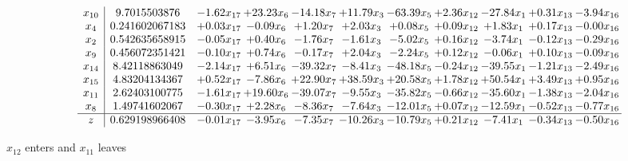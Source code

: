 \documentclass[9pt]{article}
\begin{document}
 \[\begin{array}{c| c c@{\hskip 2pt} c@{\hskip 2pt} c@{\hskip 2pt} c@{\hskip 2pt} c@{\hskip 2pt} c@{\hskip 2pt} c@{\hskip 2pt} c@{\hskip 2pt} c@{\hskip 2pt} }
 x_{10}   &  9.7015503876 & -1.62 x_{17} & + 23.23 x_{6} & -14.18 x_{7} & + 11.79 x_{3} & -63.39 x_{5} & +  2.36 x_{12} & -27.84 x_{1} & +  0.31 x_{13} & -3.94 x_{16}\\
 x_{4}   &  0.241602067183 & +  0.03 x_{17} & -0.09 x_{6} & +  1.20 x_{7} & +  2.03 x_{3} & +  0.08 x_{5} & +  0.09 x_{12} & +  1.83 x_{1} & +  0.17 x_{13} & -0.00 x_{16}\\
 x_{2}   &  0.542635658915 & -0.05 x_{17} & +  0.40 x_{6} & -1.76 x_{7} & -1.61 x_{3} & -5.02 x_{5} & +  0.16 x_{12} & -3.74 x_{1} & -0.12 x_{13} & -0.29 x_{16}\\
 x_{9}   &  0.456072351421 & -0.10 x_{17} & +  0.74 x_{6} & -0.17 x_{7} & +  2.04 x_{3} & -2.24 x_{5} & +  0.12 x_{12} & -0.06 x_{1} & +  0.10 x_{13} & -0.09 x_{16}\\
 x_{14}   &  8.42118863049 & -2.14 x_{17} & +  6.51 x_{6} & -39.32 x_{7} & -8.41 x_{3} & -48.18 x_{5} & -0.24 x_{12} & -39.55 x_{1} & -1.21 x_{13} & -2.49 x_{16}\\
 x_{15}   &  4.83204134367 & +  0.52 x_{17} & -7.86 x_{6} & + 22.90 x_{7} & + 38.59 x_{3} & + 20.58 x_{5} & +  1.78 x_{12} & + 50.54 x_{1} & +  3.49 x_{13} & +  0.95 x_{16}\\
 x_{11}   &  2.62403100775 & -1.61 x_{17} & + 19.60 x_{6} & -39.07 x_{7} & -9.55 x_{3} & -35.82 x_{5} & -0.66 x_{12} & -35.60 x_{1} & -1.38 x_{13} & -2.04 x_{16}\\
 x_{8}   &  1.49741602067 & -0.30 x_{17} & +  2.28 x_{6} & -8.36 x_{7} & -7.64 x_{3} & -12.01 x_{5} & +  0.07 x_{12} & -12.59 x_{1} & -0.52 x_{13} & -0.77 x_{16}\\
\hline
z    &  0.629198966408 & -0.01 x_{17} & -3.95 x_{6} & -7.35 x_{7} & -10.26 x_{3} & -10.79 x_{5} & +  0.21 x_{12} & -7.41 x_{1} & -0.34 x_{13} & -0.50 x_{16}\\
\end{array}\]


 $ x_{12} $ enters and $ x_{11} $ leaves 
\end{document}
